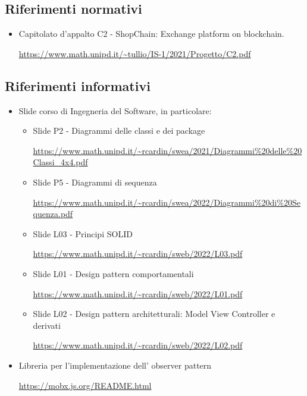 \subsection{Riferimenti normativi}
\begin{itemize}
    \item Capitolato d'appalto C2 - ShopChain: Exchange platform on blockchain.
    \begin{center}
       \url{https://www.math.unipd.it/~tullio/IS-1/2021/Progetto/C2.pdf}
    \end{center} 
\end{itemize}

\subsection{Riferimenti informativi}
\begin{itemize}
    \item Slide corso di Ingegneria del Software, in particolare:
    \begin{itemize}
        \item Slide P2 - Diagrammi delle classi e dei package
        \begin{center}
            \url{https://www.math.unipd.it/~rcardin/swea/2021/Diagrammi%20delle%20Classi_4x4.pdf}
        \end{center}
        \item Slide P5 - Diagrammi di sequenza
        \begin{center}
            \url{https://www.math.unipd.it/~rcardin/swea/2022/Diagrammi%20di%20Sequenza.pdf}
        \end{center}
        \item Slide L03 - Principi SOLID
        \begin{center}
            \url{https://www.math.unipd.it/~rcardin/sweb/2022/L03.pdf}
        \end{center}
        \item Slide L01 - Design pattern comportamentali
        \begin{center}
            \url{https://www.math.unipd.it/~rcardin/sweb/2022/L01.pdf}
        \end{center}
        \item Slide L02 - Design pattern architetturali: Model View Controller e derivati
        \begin{center}
            \url{https://www.math.unipd.it/~rcardin/sweb/2022/L02.pdf}
        \end{center}    
        \end{itemize}
    \item Libreria per l'implementazione dell' observer pattern
    \begin{center}
        \url{https://mobx.js.org/README.html}
    \end{center}
\end{itemize}    